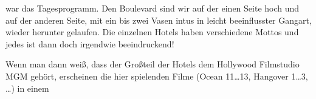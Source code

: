  war das Tagesprogramm.
Den Boulevard sind wir auf der einen Seite hoch und auf der anderen Seite, mit ein bis zwei Vasen intus in leicht beeinflusster Gangart, wieder herunter gelaufen.
Die einzelnen Hotels haben verschiedene Mottos und jedes ist dann doch irgendwie beeindruckend!

Wenn man dann weiß, dass der Großteil der Hotels dem Hollywood Filmstudio MGM gehört, erscheinen die hier spielenden Filme (Ocean 11\dots 13, Hangover 1\dots 3, \dots) in einem

\thispagestyle{empty}

